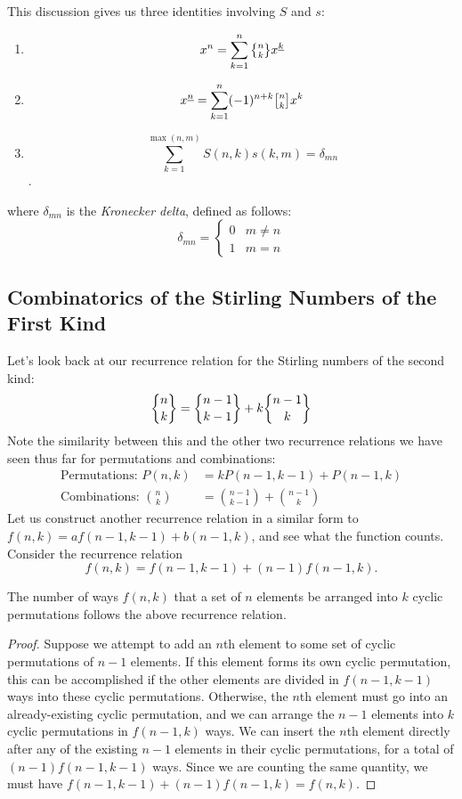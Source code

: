 This discussion gives us three identities involving $S$ and $s$: 
\begin{enumerate}
	\item \[ x^n = \sum_{k=1}^{n} \stirii{n}{k} \ff{x}{k} \] %
	\item \[ \ff{x}{n} = \sum_{k=1}^{n} (-1)^{n+k} \stiri{n}{k} x^k \] %
	\item \[ \sum_{k=1}^{\max(n, m)} S(n, k) s(k, m) = \delta_{mn} \].
\end{enumerate}
where $\delta_{mn}$ is the \textit{Kronecker delta}, defined as follows: 
\[
	\delta_{mn} = \begin{cases}
		0 & m \neq n \\
		1 & m = n
	\end{cases}
\]



\subsection{Combinatorics of the Stirling Numbers of the First Kind}
Let's look back at our recurrence relation for the Stirling numbers of the second kind: 
\[
	\dstirii{n}{k} = \dstirii{n-1}{k-1} + k \dstirii{n-1}{k}
\]
Note the similarity between this and the other two recurrence relations we have seen thus far for permutations and combinations: 
\begin{align*}
	\text{Permutations: } P(n, k) &= k P(n-1, k-1) + P(n-1, k) \\
	\text{Combinations: } \binom{n}{k} &= \binom{n-1}{k-1} + \binom{n-1}{k} 
\end{align*}
Let us construct another recurrence relation in a similar form to $f(n, k) = af(n-1, k-1) + b(n-1, k)$, and see what the function counts. Consider the recurrence relation 
\[
	f(n, k) = f(n-1, k-1) + (n-1) f(n-1, k).
\]
\begin{proposition}{1}
The number of ways $f(n, k)$ that a set of $n$ elements be arranged into $k$ cyclic permutations follows the above recurrence relation. 
\end{proposition}

\begin{proof}
	Suppose we attempt to add an $n$th element to some set of cyclic permutations of $n-1$ elements. If this element forms its own cyclic permutation, this can be accomplished if the other elements are divided in $f(n-1, k-1)$ ways into these cyclic permutations. Otherwise, the $n$th element must go into an already-existing cyclic permutation, and we can arrange the $n-1$ elements into $k$ cyclic permutations in $f(n-1, k)$ ways. We can insert the $n$th element directly after any of the existing $n-1$ elements in their cyclic permutations, for a total of $(n-1)f(n-1, k-1)$ ways. Since we are counting the same quantity, we must have $f(n-1, k-1) + (n-1)f(n-1, k) = f(n, k)$. 
\end{proof}

